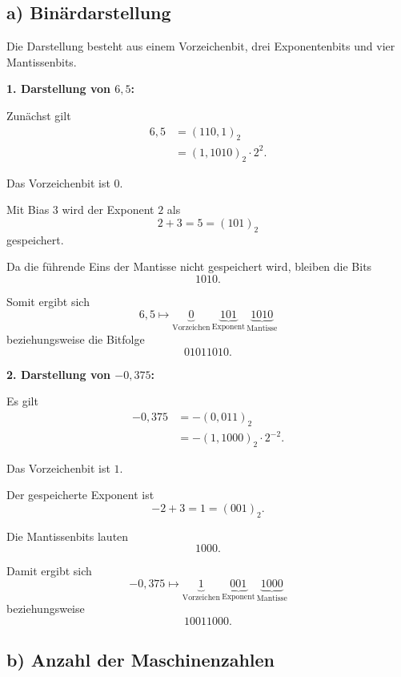 \documentclass{report}
\begin{document}
\sol

\subsection*{a) Binärdarstellung}

\begin{myproof}
  Die Darstellung besteht aus einem Vorzeichenbit,
  drei Exponentenbits und vier Mantissenbits.

  \textbf{1. Darstellung von $6{,}5$:}

  Zunächst gilt
  \begin{align*}
    6{,}5
    &=(110{,}1)_2\\
    &=(1{,}1010)_2\cdot2^2.
  \end{align*}

  Das Vorzeichenbit ist $0$.

  Mit Bias $3$ wird der Exponent $2$ als
  \[
    2+3=5=(101)_2
  \]
  gespeichert.

  Da die führende Eins der Mantisse nicht
  gespeichert wird, bleiben die Bits
  \[
    1010.
  \]

  Somit ergibt sich
  \[
    \boxed{
      6{,}5\longmapsto
      \underbrace{0}_{\text{Vorzeichen}}\,
      \underbrace{101}_{\text{Exponent}}\,
      \underbrace{1010}_{\text{Mantisse}}
    }
  \]
  beziehungsweise die Bitfolge
  \[
    \boxed{01011010.}
  \]

  \medskip
  \textbf{2. Darstellung von $-0{,}375$:}

  Es gilt
  \begin{align*}
    -0{,}375
    &=-(0{,}011)_2\\
    &=-(1{,}1000)_2\cdot2^{-2}.
  \end{align*}

  Das Vorzeichenbit ist $1$.

  Der gespeicherte Exponent ist
  \[
    -2+3=1=(001)_2.
  \]

  Die Mantissenbits lauten
  \[
    1000.
  \]

  Damit ergibt sich
  \[
    \boxed{
      -0{,}375\longmapsto
      \underbrace{1}_{\text{Vorzeichen}}\,
      \underbrace{001}_{\text{Exponent}}\,
      \underbrace{1000}_{\text{Mantisse}}
    }
  \]
  beziehungsweise
  \[
    \boxed{10011000.}
  \]
\end{myproof}


\subsection*{b) Anzahl der Maschinenzahlen}
\end{document}
